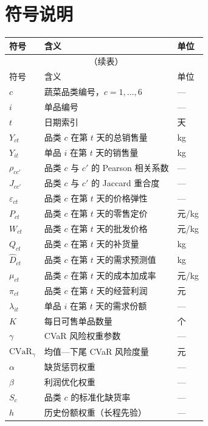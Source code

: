 \documentclass[withoutpreface,bwprint]{cumcmthesis} %
\numberwithin{equation}{section}
\begin{document}
\section{符号说明}
\begin{longtable}{p{2.5em}>{\centering\arraybackslash}p{\dimexpr\textwidth-5em\relax}p{2em}}

\toprule[1.5pt]
符号 & 含义 & 单位 \\
\midrule[1pt]
\endfirsthead
\multicolumn{3}{c}{\tablename~\thetable{}（续表）} \\
\midrule[1pt]
符号 & 含义 & 单位 \\
\midrule[1pt]
\endhead
\bottomrule[1.5pt]
\endfoot
\bottomrule[1.5pt]
\endlastfoot
$c$ & 蔬菜品类编号，$c=1,\ldots,6$ & --- \\
$i$ & 单品编号 & --- \\
$t$ & 日期索引 & 天 \\
$Y_{ct}$ & 品类 $c$ 在第 $t$ 天的总销售量 & kg \\
$Y_{it}$ & 单品 $i$ 在第 $t$ 天的销售量 & kg \\
$\rho_{cc'}$ & 品类 $c$ 与 $c'$ 的 Pearson 相关系数 & --- \\
$J_{cc'}$ & 品类 $c$ 与 $c'$ 的 Jaccard 重合度 & --- \\
$\varepsilon_{ct}$ & 品类 $c$ 在第 $t$ 天的价格弹性 & --- \\
$P_{ct}$ & 品类 $c$ 在第 $t$ 天的零售定价 & 元/kg \\
$W_{ct}$ & 品类 $c$ 在第 $t$ 天的批发价格 & 元/kg \\
$Q_{ct}$ & 品类 $c$ 在第 $t$ 天的补货量 & kg \\
$\hat{D}_{ct}$ & 品类 $c$ 在第 $t$ 天的需求预测值 & kg \\
$\mu_{ct}$ & 品类 $c$ 在第 $t$ 天的成本加成率 & 元/kg \\
$\pi_{ct}$ & 品类 $c$ 在第 $t$ 天的经营利润 & 元 \\
$\lambda_{it}$ & 单品 $i$ 在第 $t$ 天的需求份额 & --- \\
$K$ & 每日可售单品数量 & 个 \\
$\gamma$ & CVaR 风险权重参数 & --- \\
$\text{CVaR}_{\gamma}$ & 均值—下尾 CVaR 风险度量 & 元 \\
$\alpha$ & 缺货惩罚权重 & --- \\
$\beta$ & 利润优化权重 & --- \\
$S_c$ & 品类 $c$ 的标准化缺货率 & --- \\
$h$ & 历史份额权重（长程先验） & --- \\
\end{longtable}
\end{document}
